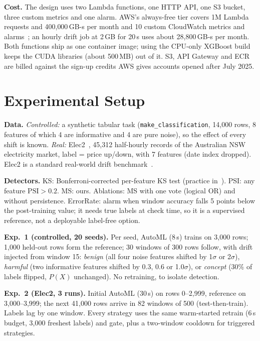 \documentclass[conference]{IEEEtran}
\newcommand{\ours}{\textsc{MS}}
\begin{document}
\textbf{Cost.} The design uses two Lambda functions, one HTTP API, one S3 bucket, three custom metrics and one alarm. AWS's always-free tier covers 1M Lambda requests and 400{,}000\,GB-s per month and 10 custom CloudWatch metrics and alarms~\cite{awsfree}; an hourly drift job at 2\,GB for 20\,s uses about 28{,}800\,GB-s per month. Both functions ship as one container image; using the CPU-only XGBoost build keeps the CUDA libraries (about 500\,MB) out of it. S3, API Gateway and ECR are billed against the sign-up credits AWS gives accounts opened after July 2025.

\section{Experimental Setup}
\textbf{Data.} \emph{Controlled:} a synthetic tabular task (\texttt{make\_classification}, 14{,}000 rows, 8 features of which 4 are informative and 4 are pure noise), so the effect of every shift is known. \emph{Real:} Elec2~\cite{harries1999}, 45{,}312 half-hourly records of the Australian NSW electricity market, label = price up/down, with 7 features (date index dropped). Elec2 is a standard real-world drift benchmark~\cite{gama2014}.

\textbf{Detectors.} KS: Bonferroni-corrected per-feature KS test (practice in~\cite{eck2022}). PSI: any feature $\text{PSI}>0.2$. \ours: ours. Ablations: \ours{} with one vote (logical OR) and without persistence. ErrorRate: alarm when window accuracy falls 5 points below the post-training value; it needs true labels at check time, so it is a supervised reference, not a deployable label-free option.

\textbf{Exp.~1 (controlled, 20 seeds).} Per seed, AutoML (8\,s) trains on 3{,}000 rows; 1{,}000 held-out rows form the reference; 30 windows of 300 rows follow, with drift injected from window 15: \emph{benign} (all four noise features shifted by 1$\sigma$ or 2$\sigma$), \emph{harmful} (two informative features shifted by 0.3, 0.6 or 1.0$\sigma$), or \emph{concept} (30\% of labels flipped, $P(X)$ unchanged). No retraining, to isolate detection.

\textbf{Exp.~2 (Elec2, 3 runs).} Initial AutoML (30\,s) on rows 0--2{,}999, reference on 3{,}000--3{,}999; the next 41{,}000 rows arrive in 82 windows of 500 (test-then-train). Labels lag by one window. Every strategy uses the same warm-started retrain (6\,s budget, 3{,}000 freshest labels) and gate, plus a two-window cooldown for triggered strategies.
\end{document}
